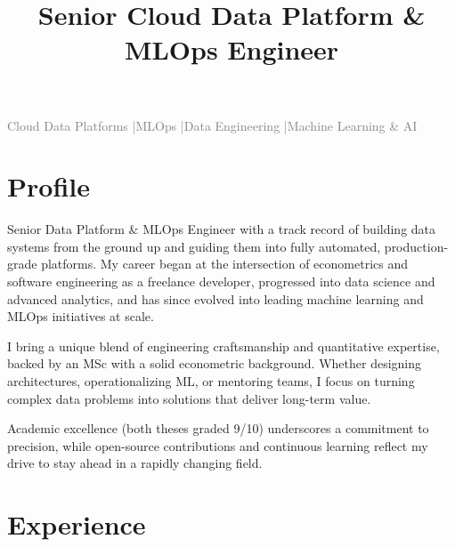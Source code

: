 \documentclass[11pt,a4paper]{moderncv}
\title{Senior Cloud Data Platform \& MLOps Engineer}
\begin{document}

\makecvtitle
\begin{center}
  \vspace{-0.5em}
  \textcolor{gray}{\footnotesize Cloud Data Platforms \quad|\quad MLOps \quad|\quad Data Engineering \quad|\quad Machine Learning \& AI}
  \vspace{2em}
\end{center}

\section{Profile}

Senior Data Platform \& MLOps Engineer with a track record of building data
systems from the ground up and guiding them into fully automated,
production-grade platforms. My career began at the intersection of econometrics
and software engineering as a freelance developer, progressed into data science
and advanced analytics, and has since evolved into leading machine learning and
MLOps initiatives at scale.

\vspace{0.5em}

I bring a unique blend of engineering craftsmanship and quantitative expertise,
backed by an MSc with a solid econometric background. Whether designing
architectures, operationalizing ML, or mentoring teams, I focus on turning
complex data problems into solutions that deliver long-term value.

\vspace{0.5em}

Academic excellence (both theses graded 9/10) underscores a commitment to
precision, while open-source contributions and continuous learning reflect my
drive to stay ahead in a rapidly changing field.

\newpage

\section{Experience}
\end{document}
